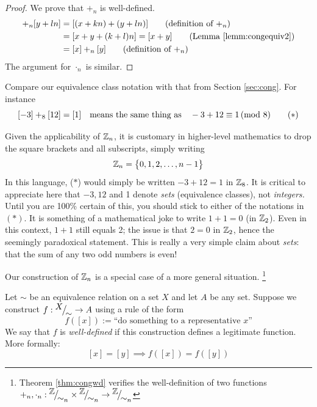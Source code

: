 \begin{proof}
	We prove that $+_n$ is well-defined.
	\begin{align*}
		[x+kn]+_n[y+ln]&=[(x+kn)+(y+ln)] \tag{definition of $+_n$}\\
		&=[x+y+(k+l)n] =[x+y] \tag{Lemma \ref{lemm:congequiv2}}\\
		&=[x]+_n[y] \tag{definition of $+_n$}
	\end{align*}
	The argument for $\cdot_n$ is similar.
\end{proof}



Compare our equivalence class notation with that from Section \ref{sec:cong}. For instance
\[
	[-3]+_8[12]=[1] \quad \text{means the same thing as} \quad -3+12\equiv 1\negthickspace\pmod{8} \tag{$\ast$}
\]


\begin{aside}{}{}
	Given the applicability of $\mathbb{Z}_n$, it is customary in higher-level mathematics to drop the square brackets and all subscripts, simply writing
	\[
		\mathbb{Z}_n=\bigl\{0,1,2,\ldots,n-1\bigr\}
	\]
	In this language, ($\ast$) would simply be written $-3+12=1$ in $\mathbb{Z}_8$. It is critical to appreciate here that $-3,12$ and 1 denote \emph{sets} (equivalence classes), not \emph{integers.} Until you are 100\% certain of this, you should stick to either of the notations in $(\ast)$.\smallbreak
	It is something of a mathematical joke to write $1+1=0$ (in $\mathbb{Z}_2$). Even in this context, $1+1$ still equals 2; the issue is that $2=0$ in $\mathbb{Z}_2$, hence the seemingly paradoxical statement. This is really a very simple claim about \emph{sets}: that the sum of any two odd numbers is even!
\end{aside}


\goodbreak



Our construction of $\mathbb{Z}_n$ is a special case of a more general situation.%
\footnote{Theorem \ref{thm:congwd} verifies the well-definition of two functions $+_n,\cdot_n:{}^{\textstyle {\mathbb{Z}}}\!\big/_{\textstyle \!{\sim_n}}\times{}^{\textstyle {\mathbb{Z}}}\!\big/_{\textstyle \!{\sim_n}}\to{}^{\textstyle {\mathbb{Z}}}\!\big/_{\textstyle \!{\sim_n}}$}

\begin{defn}{}{}
	Let $\sim$ be an equivalence relation on a set $X$ and let $A$ be any set. Suppose we construct $f:{}^{\textstyle {X}}\!\big/_{\textstyle \!{\sim}}\to A$ using a rule of the form
	\[
		f([x]):= \text{``do something to a representative $x$''}
	\]
	We say that $f$ is \emph{well-defined} if this construction defines a legitimate function. More formally:
	\[
		[x]=[y] \implies f([x])=f([y])
	\]
\end{defn}


